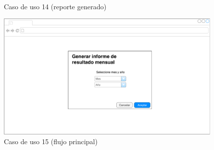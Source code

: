 \documentclass[12pt]{article}
\begin{document}
\vfill
\begin{figure}[h!]
\caption{Caso de uso 14 (reporte generado)}
\end{figure}
\vfill





\vfill
\begin{figure}[h!]
\includegraphics[width=\textwidth]{CU15/CU-151.pdf}
\caption{Caso de uso 15 (flujo principal)}
\end{figure}
\vfill
\end{document}

